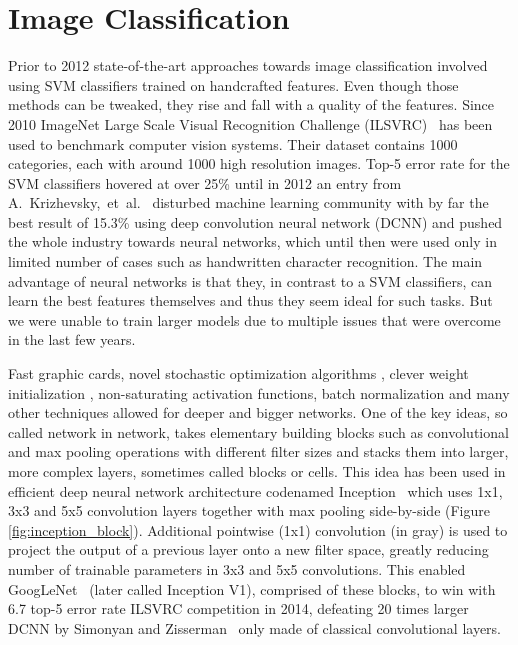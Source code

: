 \section*{Image Classification}
Prior to 2012 state-of-the-art approaches towards image classification involved using SVM classifiers trained on handcrafted features. Even though those methods can be tweaked, they rise and fall with a quality of the features. Since 2010 ImageNet Large Scale Visual Recognition Challenge (ILSVRC)~\cite{ILSVRC15} has been used to benchmark computer vision systems. Their dataset contains 1000 categories, each with around 1000 high resolution images. Top-5 error rate for the SVM classifiers hovered at over 25\% until in 2012 an entry from A.~Krizhevsky,~et~al.~\cite{AlexNet} disturbed machine learning community with by far the best result of 15.3\% using deep convolution neural network (DCNN) and pushed the whole industry towards neural networks, which until then were used only in limited number of cases such as handwritten character recognition. The main advantage of neural networks is that they, in contrast to a SVM classifiers, can learn the best features themselves and thus they seem ideal for such tasks. But we were unable to train larger models due to multiple issues that were overcome in the last few years.

Fast graphic cards, novel stochastic optimization algorithms \cite{kingma2014adam}, clever weight initialization \cite{glorot2010understanding}, non-saturating activation functions, batch normalization \cite{ioffe2015batch} and many other techniques allowed for deeper and bigger networks. One of the key ideas, so called network in network, takes elementary building blocks such as convolutional and max pooling operations with different filter sizes and stacks them into larger, more complex layers, sometimes called blocks or cells. This idea has been used in efficient deep neural network architecture codenamed Inception~\cite{szegedy2015going} which uses 1x1, 3x3 and 5x5 convolution layers together with max pooling side-by-side (Figure \ref{fig:inception_block}). Additional pointwise (1x1) convolution (in gray) is used to project the output of a previous layer onto a new filter space, greatly reducing number of trainable parameters in 3x3 and 5x5 convolutions. This enabled GoogLeNet~\cite{szegedy2015going} (later called Inception V1), comprised of these blocks, to win with 6.7 top-5 error rate ILSVRC competition in 2014, defeating 20 times larger DCNN by Simonyan and Zisserman~\cite{simonyan2014very} only made of classical convolutional layers.

